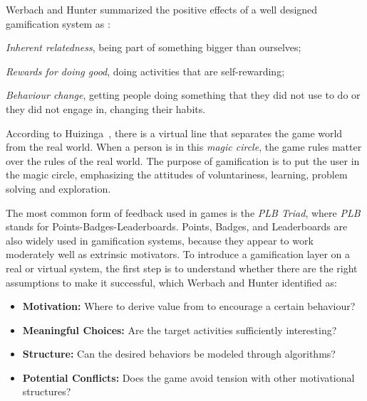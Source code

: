 Werbach and Hunter summarized the positive effects of a well designed gamification system as \cite{Werb2012a}:
\begin{inparaenum}[i)]
  \item \emph{Inherent relatedness}, \ie being part of something bigger than ourselves;
  \item \emph{Rewards for doing good}, \ie doing activities that are self-rewarding;
  \item \emph{Behaviour change}, \ie getting people doing something that they did not use to do or they did not engage in, changing their habits.
\end{inparaenum}

According to Huizinga~\cite{Huizinga2006}, there is a virtual line that separates the game world from the real world.
When a person is in this \emph{magic circle}, the game rules matter over the rules of the real world.
The purpose of gamification is to put the user in the magic circle, emphasizing the attitudes of voluntariness, learning, problem solving and exploration.

The most common form of feedback used in games is the \emph{PLB Triad}, where \emph{PLB} stands for Points-Badges-Leaderboards.
Points, Badges, and Leaderboards are also widely used in gamification systems, because they appear to work moderately well as extrinsic motivators.
To introduce a gamification layer on a real or virtual system, the first step is to understand whether there are the right assumptions to make it successful, which Werbach and Hunter \cite{Werb2012a} identified as:

\begin{itemize}
  \item \textbf{Motivation:} Where to derive value from to encourage a certain behaviour?
  \item \textbf{Meaningful Choices:} Are the target activities sufficiently interesting?
  \item \textbf{Structure:} Can the desired behaviors be modeled through algorithms?
  \item \textbf{Potential Conflicts:} Does the game avoid tension with other motivational structures?
\end{itemize}

